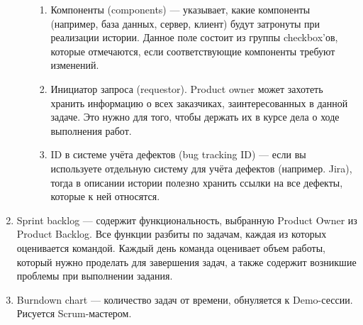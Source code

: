 \documentclass{article}
\begin{document}
\begin{enumerate}
\begin{itemize}
\begin{enumerate}
                \item Компоненты (components) — указывает, какие компоненты (например, база данных, сервер, клиент) будут затронуты при реализации истории. Данное поле состоит из группы checkbox’ов, которые отмечаются, если соответствующие компоненты требуют изменений.
                \item Инициатор запроса (requestor). Product owner может захотеть хранить информацию о всех заказчиках, заинтересованных в данной задаче. Это нужно для того, чтобы держать их в курсе дела о ходе выполнения работ.
                \item ID в системе учёта дефектов (bug tracking ID) — если вы используете отдельную систему для учёта дефектов (например. Jira), тогда в описании истории полезно хранить ссылки на все дефекты, которые к ней относятся.
            \end{enumerate}
        \end{itemize}
        \item Sprint backlog — содержит функциональность, выбранную Product Owner из Product Backlog. Все функции разбиты по задачам, каждая из которых оценивается командой. Каждый день команда оценивает объем работы, который нужно проделать для завершения задач, а также содержит возникшие проблемы при выполнении задания.
        \item Burndown chart — количество задач от времени, обнуляется к Demo-сессии. Рисуется Scrum-мастером.
    \end{enumerate}
\end{document}

